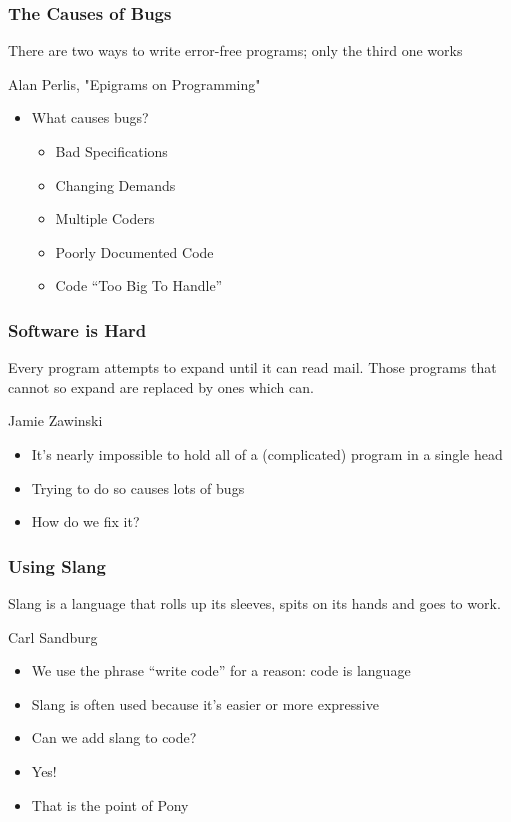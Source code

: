 \documentclass[bigger]{beamer}
\begin{document}
\begin{frame}
\frametitle{The Causes of Bugs}
\label{sec-3}


\epigraph{There are two ways to write error-free programs; only the third one works}{Alan Perlis, "Epigrams on Programming"}


\begin{itemize}
\item What causes bugs?
  \pause
\begin{itemize}
\item Bad Specifications
    \pause
\item Changing Demands
    \pause
\item Multiple Coders
    \pause
\item Poorly Documented Code
    \pause
\item Code ``Too Big To Handle''
\end{itemize}
\end{itemize}
\end{frame}
\begin{frame}
\frametitle{Software is Hard}
\label{sec-4}


\epigraph{Every program attempts to expand until it can read mail. Those programs that cannot so expand are replaced by ones which can.}{Jamie Zawinski}


\begin{itemize}
\item It's nearly impossible to hold all of a (complicated) program in a single head
\item Trying to do so causes lots of bugs
\item How do we fix it?
\end{itemize}
\end{frame}
\begin{frame}
\frametitle{Using Slang}
\label{sec-5}


\epigraph{Slang is a language that rolls up its sleeves, spits on its hands and goes to work.}{Carl Sandburg}


\begin{itemize}
\item We use the phrase ``write code'' for a reason: code is language
\item Slang is often used because it's easier or more expressive
\end{itemize}
\pause

\begin{itemize}
\item Can we add slang to code?
\end{itemize}
\pause

\begin{itemize}
\item Yes!
\item That is the point of Pony
\end{itemize}
\end{frame}
\end{document}
